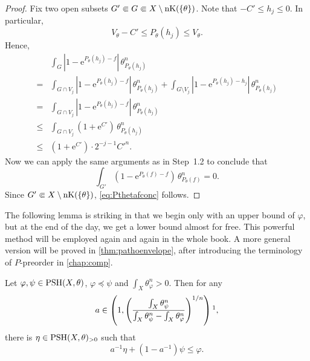 \begin{proof}
    Fix two open subsets $G'\Subset G\Subset X\setminus \operatorname{nK}(\{\theta\})$. Note that $-C'\leq h_j\leq 0$. In particular,
    \[
    V_{\theta}-C'\leq P_{\theta}(h_j)\leq V_{\theta}.
    \]
    Hence,
    \[
    \begin{aligned}
        &\int_G \left| 1-\mathrm{e}^{P_{\theta}(h_j)-f}\right|\,\theta_{P_{\theta}(h_j)}^n\\
        =&\int_{G\cap V_j} \left|1-\mathrm{e}^{P_{\theta}(h_j)-f}\right|\,\theta_{P_{\theta}(h_j)}^n+\int_{G\setminus V_j} \left|1-\mathrm{e}^{P_{\theta}(h_j)-h_j}\right|\,\theta_{P_{\theta}(h_j)}^n\\
        =& \int_{G\cap V_j} \left|1-\mathrm{e}^{P_{\theta}(h_j)-f}\right|\,\theta_{P_{\theta}(h_j)}^n\\
        \leq & \int_{G\cap V_j} \left( 1+\mathrm{e}^{C'}\right)\,\theta_{P_{\theta}(h_j)}^n\\
        \leq & \left( 1+\mathrm{e}^{C'}\right) \cdot 2^{-j-1} C'^n.
    \end{aligned}
    \]
    Now we can apply the same arguments as in Step~1.2 to conclude that
    \[
    \int_{G'}\left(1-\mathrm{e}^{P_{\theta}(f)-f}\right)\,\theta_{P_{\theta}(f)}^n=0.
    \]
    Since $G'\Subset X\setminus \operatorname{nK}(\{\theta\})$, \eqref{eq:Pthetafconc} follows.
\end{proof}



The following lemma is striking in that we begin only with an upper bound of $\varphi$, but at the end of the day, we get a lower bound almost for free. This powerful method will be employed again and again in the whole book. A more general version will be proved in \cref{thm:pathoenvelope}, after introducing the terminology of $P$-preorder in \cref{chap:comp}.
\begin{lemma}\label{lma:pathoenvelope}
    Let $\varphi,\psi\in \mathrm{PSH}(X,\theta)$, $\varphi\preceq \psi$ and $\int_X \theta_{\varphi}^n>0$. Then for any
    \begin{equation}\label{eq:arangetemp}
    a\in \left( 1, \left(\frac{\int_X \theta_{\psi}^n}{\int_X \theta_{\psi}^n-\int_X \theta_{\varphi}^n}\right)^{1/n} \right)\footnotemark,
    \end{equation}
    there is $\eta\in \mathrm{PSH}(X,\theta)_{>0}$ such that
    \begin{equation}\label{eq:path_env}
        a^{-1}\eta+\left(1-a^{-1}\right)\psi\leq \varphi.
    \end{equation}
\end{lemma}

